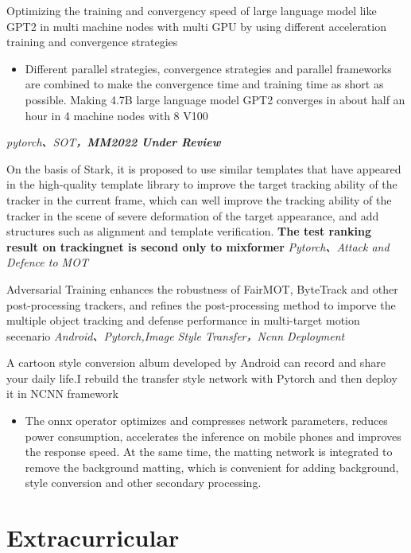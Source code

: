 \documentclass{uniquecv}
\begin{document}
Optimizing the training and convergency speed of large language model like GPT2 in multi machine nodes with multi GPU by using different acceleration training and convergence strategies
\begin{itemize}
  \item Different parallel strategies, convergence strategies and parallel frameworks are combined to make the convergence time and training time as short as possible. Making 4.7B large language model GPT2 converges in about half an hour in 4 machine nodes with 8 V100
\end{itemize}
\textit{pytorch、SOT，\textbf{MM2022 Under Review}}
\vspace{0.4ex}

On the basis of Stark, it is proposed to use similar templates that have appeared in the high-quality template library to improve the target tracking ability of the tracker in the current frame, which can well improve the tracking ability of the tracker in the scene of severe deformation of the target appearance, and add structures such as alignment and template verification. \textbf{The test ranking result on trackingnet is second only to mixformer}
\textit{Pytorch、Attack and Defence to MOT}
\vspace{0.4ex}

Adversarial Training enhances the robustness of FairMOT, ByteTrack and other post-processing trackers, and refines the post-processing method to imporve the multiple object tracking and defense performance in multi-target motion secenario
\textit{Android、Pytorch,Image Style Transfer，Ncnn Deployment}
\vspace{0.4ex}

A cartoon style conversion album developed by Android can record and share your daily life.I rebuild the transfer style network with Pytorch and then deploy it in NCNN 
framework 
\begin{itemize}
  \item The onnx operator optimizes and compresses network parameters, reduces power consumption, accelerates the inference on mobile phones and improves the response speed. At the same time, the matting network is integrated to remove the background matting, which is convenient for adding background, style conversion and other secondary processing.
\end{itemize}
\section{Extracurricular}
\end{document}
